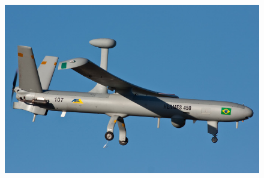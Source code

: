 \documentclass[t]{beamer}
\begin{document}
\begin{frame}[c]
\begin{minipage}{0.28\linewidth}
		\begin{figure}[h]
			\includegraphics[width=\textwidth]{imgs/hermes}
		\end{figure}
	\end{minipage}
\end{frame}
\end{document}
